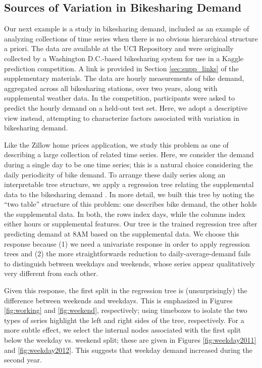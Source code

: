 \documentclass[12pt]{article}
\begin{document}
\subsection{Sources of Variation in Bikesharing
Demand}\label{bikesharing-study}

Our next example is a study in bikesharing demand, included as an example of
analyzing collections of time series when there is no obvious hierarchical
structure a priori. The data are available at the UCI Repository and were
originally collected by a Washington D.C.-based bikesharing system for use in a
Kaggle prediction competition. A link is provided in Section
\ref{sec:supp_links} of the supplementary materials. The data are hourly
measurements of bike demand, aggregated across all bikesharing stations, over
two years, along with supplemental weather data. In the competition,
participants were asked to predict the hourly demand on a held-out test set.
Here, we adopt a descriptive view instead, attempting to characterize factors
associated with variation in bikesharing demand.

Like the Zillow home prices application, we study this problem as one of
describing a large collection of related time series. Here, we consider
the demand during a single day to be one time series; this is a natural
choice considering the daily periodicity of bike demand. To arrange
these daily series along an interpretable tree structure, we apply a
regression tree relating the supplemental data to the bikesharing demand
\citep{breiman1984classification}. In more
detail, we built this tree by noting the ``two table'' structure of this
problem: one describes bike demand, the other holds the supplemental
data. In both, the rows index days, while the columns index either hours
or supplemental features. Our tree is the trained regression tree after
predicting demand at 8AM based on the supplemental data. We choose this
response because (1) we need a univariate response in order to apply
regression trees and (2) the more straightforwards reduction to
daily-average-demand fails to distinguish between weekdays and weekends,
whose series appear qualitatively very different from each other.

Given this response, the first split in the regression tree is
(unsurprisingly) the difference between weekends and weekdays. This is
emphasized in Figures \ref{fig:working} and \ref{fig:weekend}, respectively;
using timeboxes to isolate the two types of series highlight the left and right
sides of the tree, respectively. For a more subtle effect, we select the
internal nodes associated with the first split below the weekday vs. weekend
split; these are given in Figures \ref{fig:weekday2011} and
\ref{fig:weekday2012}. This suggests that weekday demand increased during the
second year.
\end{document}
